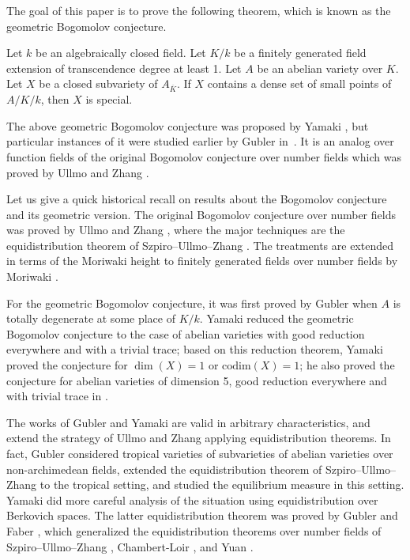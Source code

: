\documentclass[12pt]{amsart}
\begin{document}
The goal of this paper is to prove the following theorem, which is known as the geometric Bogomolov conjecture. 

\begin{thm} \label{thmmain} 
Let $k$ be an algebraically closed field.
Let $K/k$ be a finitely generated field extension of transcendence degree at least 1.
Let $A$ be an abelian variety over $K$. 
Let $X$ be a closed subvariety of $A_{\overline{K}}$. 
If $X$ contains a dense set of small points of $A/K/k$, then $X$ is special.
\end{thm}

The above geometric Bogomolov conjecture was proposed by Yamaki \cite[Conjecture 0.3]{Yamaki2013}, but particular
 instances of it were studied earlier by Gubler in~\cite{Gubler2007}. It is an analog over function fields of the original Bogomolov conjecture over number fields which was proved by Ullmo \cite{Ullmo1998} and Zhang \cite{Zhang1998}.

Let us give a quick historical recall on results about the Bogomolov conjecture and its geometric version.
The original Bogomolov conjecture over number fields was proved by Ullmo \cite{Ullmo1998} and Zhang \cite{Zhang1998}, where the major techniques are the equidistribution theorem of Szpiro--Ullmo--Zhang \cite{SUZ}.
The treatments are extended in terms of the Moriwaki height to finitely generated fields over number fields by Moriwaki \cite{Moriwaki2000}.

For the geometric Bogomolov conjecture, it was first proved by Gubler \cite{Gubler2007} when $A$ is totally degenerate at some place of $K/k$.
Yamaki \cite{Yamaki2016c, Yamaki2016a} reduced the geometric Bogomolov conjecture to the case of abelian varieties with good reduction everywhere and with a trivial trace; based on this reduction theorem, Yamaki \cite{Yamaki2017} proved the conjecture for $\dim(X)=1$ or $\mathrm{codim}(X)=1$; he also proved the conjecture for abelian varieties of dimension 5, good reduction everywhere and with trivial trace in \cite{Yamaki2017a}.

The works of Gubler \cite{Gubler2007} and Yamaki \cite{Yamaki2016c} are 
valid in arbitrary characteristics, and extend the strategy of Ullmo and Zhang applying equidistribution theorems. 
In fact, Gubler \cite{Gubler2007} considered tropical varieties of subvarieties of abelian varieties over non-archimedean fields, 
extended the equidistribution theorem of Szpiro--Ullmo--Zhang to the tropical setting, and studied the equilibrium measure in this setting.
Yamaki \cite{Yamaki2016c} did more careful analysis of the situation using equidistribution over Berkovich spaces. The latter equidistribution theorem was proved by Gubler \cite{Guber2008} and Faber \cite{Faber2009b}, which generalized the equidistribution theorems over number fields of Szpiro--Ullmo--Zhang \cite{SUZ},  Chambert-Loir \cite{CL2006}, and Yuan \cite{Yuan2008}.
\end{document}
